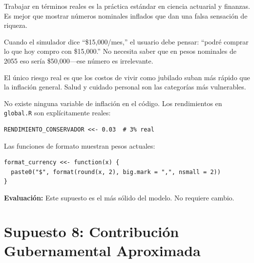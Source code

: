 \documentclass[11pt,a4paper]{report}
\begin{document}
\begin{tcolorbox}[colback=green!5!white, colframe=green!50!black, title=\textbf{Intuici\'on}]
Trabajar en t\'erminos reales es la pr\'actica est\'andar en ciencia actuarial y finanzas. Es mejor que mostrar n\'umeros nominales inflados que dan una falsa sensaci\'on de riqueza.

Cuando el simulador dice ``\$15,000/mes,'' el usuario debe pensar: ``podr\'e comprar lo que hoy compro con \$15,000.'' No necesita saber que en pesos nominales de 2055 eso ser\'ia \$50,000---ese n\'umero es irrelevante.

El \'unico riesgo real es que los costos de vivir como jubilado suban m\'as r\'apido que la inflaci\'on general. Salud y cuidado personal son las categor\'ias m\'as vulnerables.
\end{tcolorbox}

\begin{tcolorbox}[colback=orange!5!white, colframe=orange!75!black, title=\textbf{Aplicaci\'on en C\'odigo}]
No existe ninguna variable de inflaci\'on en el c\'odigo. Los rendimientos en \texttt{global.R} son expl\'icitamente reales:
\begin{lstlisting}
RENDIMIENTO_CONSERVADOR <<- 0.03  # 3% real
\end{lstlisting}

Las funciones de formato muestran pesos actuales:
\begin{lstlisting}
format_currency <<- function(x) {
  paste0("$", format(round(x, 2), big.mark = ",", nsmall = 2))
}
\end{lstlisting}

\textbf{Evaluaci\'on:} Este supuesto es el m\'as s\'olido del modelo. No requiere cambio.
\end{tcolorbox}


\section{Supuesto 8: Contribuci\'on Gubernamental Aproximada}
\end{document}
